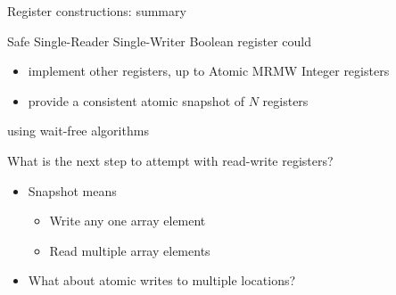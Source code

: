 \begin{frame}{Register constructions: summary}

Safe Single-Reader Single-Writer Boolean register could
\begin{itemize}
  \item implement other registers, up to Atomic MRMW Integer registers
  \item provide a consistent atomic snapshot of $N$ registers
\end{itemize}
using wait-free algorithms

\pause
What is the next step to attempt with read-write registers? 
\pause
\begin{itemize}
  \item Snapshot means
  \begin{itemize}
    \item Write any one array element
    \item Read multiple array elements
  \end{itemize}
  \pause
  \item What about atomic writes to multiple locations?
\end{itemize}
\end{frame}

